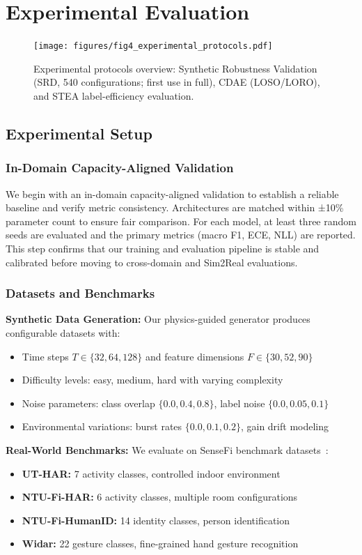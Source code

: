 \documentclass[journal]{IEEEtran}
\begin{document}
\section{Experimental Evaluation}

\begin{figure}[t]
\centering
\texttt{[image: figures/fig4\_experimental\_protocols.pdf]}
\caption{Experimental protocols overview: Synthetic Robustness Validation (SRD, 540 configurations; first use in full), CDAE (LOSO/LORO), and STEA label-efficiency evaluation.}
\label{fig:protocols}
\end{figure}

\subsection{Experimental Setup}

\subsubsection{In-Domain Capacity-Aligned Validation}
We begin with an in-domain capacity-aligned validation to establish a reliable baseline and verify metric consistency. Architectures are matched within ±10\% parameter count to ensure fair comparison. For each model, at least three random seeds are evaluated and the primary metrics (macro F1, ECE, NLL) are reported. This step confirms that our training and evaluation pipeline is stable and calibrated before moving to cross-domain and Sim2Real evaluations.

\subsubsection{Datasets and Benchmarks}

\textbf{Synthetic Data Generation:} Our physics-guided generator produces configurable datasets with:
\begin{itemize}
\item Time steps $T \in \{32, 64, 128\}$ and feature dimensions $F \in \{30, 52, 90\}$
\item Difficulty levels: easy, medium, hard with varying complexity
\item Noise parameters: class overlap $\{0.0, 0.4, 0.8\}$, label noise $\{0.0, 0.05, 0.1\}$
\item Environmental variations: burst rates $\{0.0, 0.1, 0.2\}$, gain drift modeling
\end{itemize}

\textbf{Real-World Benchmarks:} We evaluate on SenseFi benchmark datasets~\cite{yang2023sensefi}:
\begin{itemize}
\item \textbf{UT-HAR:} 7 activity classes, controlled indoor environment
\item \textbf{NTU-Fi-HAR:} 6 activity classes, multiple room configurations
\item \textbf{NTU-Fi-HumanID:} 14 identity classes, person identification
\item \textbf{Widar:} 22 gesture classes, fine-grained hand gesture recognition
\end{itemize}
\end{document}
